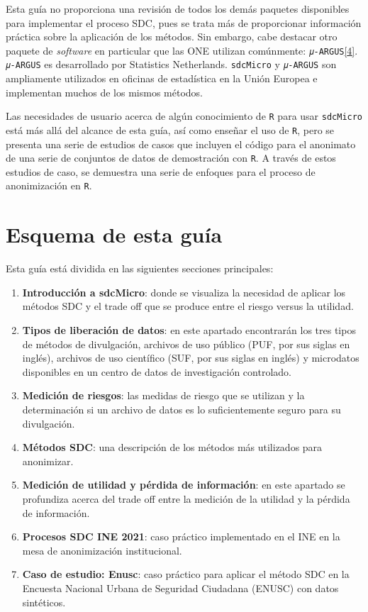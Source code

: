 \documentclass[]{book}
\theoremstyle{definition}
\theoremstyle{definition}
\theoremstyle{definition}
\theoremstyle{definition}
\theoremstyle{remark}
\begin{document}
Esta guía no proporciona una revisión de todos los demás paquetes disponibles para implementar el proceso SDC, pues se trata más de proporcionar información práctica sobre la aplicación de los métodos. Sin embargo, cabe destacar otro paquete de \emph{software} en particular que las ONE utilizan comúnmente: \texttt{𝜇-ARGUS}\protect\hyperlink{_ftn4}{{[}4{]}}. \texttt{𝜇-ARGUS} es desarrollado por Statistics Netherlands. \texttt{sdcMicro} y \texttt{𝜇-ARGUS} son ampliamente utilizados en oficinas de estadística en la Unión Europea e implementan muchos de los mismos métodos.

Las necesidades de usuario acerca de algún conocimiento de \texttt{R} para usar \texttt{sdcMicro} está más allá del alcance de esta guía, así como enseñar el uso de \texttt{R}, pero se presenta una serie de estudios de casos que incluyen el código para el anonimato de una serie de conjuntos de datos de demostración con \texttt{R}. A través de estos estudios de caso, se demuestra una serie de enfoques para el proceso de anonimización en \texttt{R}.

\hypertarget{esquema-de-esta-guuxeda}{%
\section{Esquema de esta guía}\label{esquema-de-esta-guuxeda}}

Esta guía está dividida en las siguientes secciones principales:

\begin{enumerate}
\def\labelenumi{\arabic{enumi}.}
\item
  \textbf{Introducción a sdcMicro}: donde se visualiza la necesidad de aplicar los métodos SDC y el trade off que se produce entre el riesgo versus la utilidad.
\item
  \textbf{Tipos de liberación de datos}: en este apartado encontrarán los tres tipos de métodos de divulgación, archivos de uso público (PUF, por sus siglas en inglés), archivos de uso científico (SUF, por sus siglas en inglés) y microdatos disponibles en un centro de datos de investigación controlado.
\item
  \textbf{Medición de riesgos}: las medidas de riesgo que se utilizan y la determinación si un archivo de datos es lo suficientemente seguro para su divulgación.
\item
  \textbf{Métodos SDC}: una descripción de los métodos más utilizados para anonimizar.
\item
  \textbf{Medición de utilidad y pérdida de información}: en este apartado se profundiza acerca del trade off entre la medición de la utilidad y la pérdida de información.
\item
  \textbf{Procesos SDC INE 2021}: caso práctico implementado en el INE en la mesa de anonimización institucional.
\item
  \textbf{Caso de estudio: Enusc}: caso práctico para aplicar el método SDC en la Encuesta Nacional Urbana de Seguridad Ciudadana (ENUSC) con datos sintéticos.
\end{enumerate}
\end{document}
